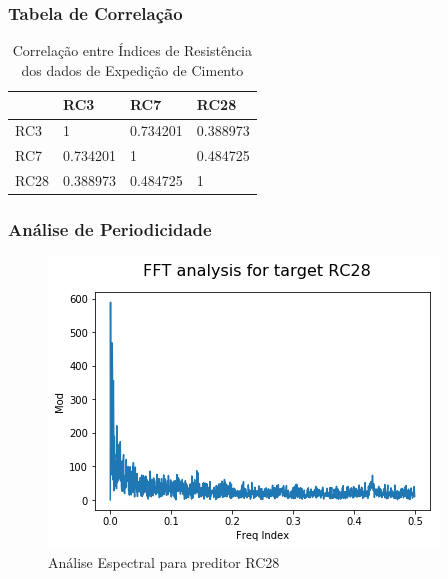\documentclass{beamer}
\begin{document}
\begin{frame}
\frametitle{Tabela de Correlação}
\begin{table}[H]
\centering
\begin{tabular}{l|lll}
\cline{2-4}
\textbf{}                  & \multicolumn{1}{l|}{RC3} & \multicolumn{1}{l|}{RC7} & \multicolumn{1}{l|}{RC28} \\ \hline
\multicolumn{1}{|l|}{RC3}  & 1                        & 0.734201                 & 0.388973                  \\ \cline{1-1}
\multicolumn{1}{|l|}{RC7}  & 0.734201                 & 1                        & 0.484725                  \\ \cline{1-1}
\multicolumn{1}{|l|}{RC28} & 0.388973                 & 0.484725                 & 1                         \\ \cline{1-1}
\end{tabular}
\caption{Correlação entre Índices de Resistência dos dados de
  Expedição de Cimento}
\label{corr3728}
\end{table}

\end{frame}

\begin{frame}
\frametitle{Análise de Periodicidade}
\begin{figure}[H]
\centering
\includegraphics[scale=0.6]{FFT_RC28.png}
\caption{Análise Espectral para preditor RC28}
\end{figure}

\end{frame}

\begin{frame}
\end{frame}
\end{document}
